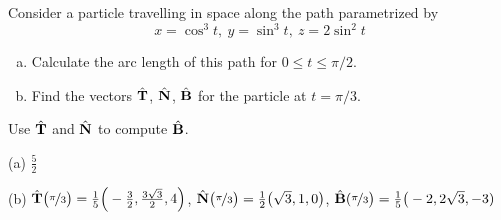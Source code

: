 \begin{question}[M317 2001A] %
Consider a particle travelling in space along the 
path parametrized by  
\begin{equation*}
x=\cos^3t,\ y=\sin ^3t,\ z=2\sin^2 t
\end{equation*}
\begin{enumerate}[(a)]
\item
Calculate the arc length of this path for $0\le t\le \pi/2$.

\item
Find the vectors $\hat{\mathbf{T}}$, $\hat{\mathbf{N}}$, $\hat{\mathbf{B}}$ for 
the particle at $t=\pi/3$.
\end{enumerate}
\end{question}

\begin{hint} 
Use $\hat{\mathbf{T}}$ and $\hat{\mathbf{N}}$ to compute $\hat{\mathbf{B}}$.
\end{hint}

\begin{answer} 
(a) $\frac{5}{2}$

(b) $\hat{\mathbf{T}}\big(\nicefrac{\pi}{3}\big)
           =\frac{1}{5}\Big(-\frac{3}{2},\frac{3\sqrt{3}}{2}, 4\Big)$,   
    $\hat{\mathbf{N}}\big(\nicefrac{\pi}{3}\big) 
               =\frac{1}{2}\big(\sqrt{3},1,0\big)$, 
    $\hat{\mathbf{B}}(\nicefrac{\pi}{3}\big)
          =\frac{1}{5}\big(-2,2\sqrt{3},-3)$ 
\end{answer}


